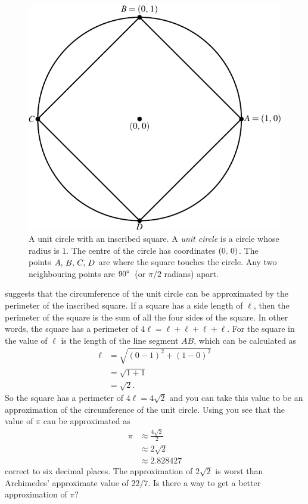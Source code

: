 \documentclass[a4paper,oneside,12pt]{article}
\begin{document}
\begin{figure}[!htbp]
\centering
\includegraphics[scale=1.1]{image/05/circle-square.pdf}
\caption{%
  A unit circle with an inscribed square.  A \emph{unit circle} is a
  circle whose radius is $1$.  The centre of the circle has
  coordinates $\left\lparen{0},\, {0}\right\rparen$.  The points ${A},\, {B},\, {C},\, {D}$ are
  where the square touches the circle.  Any two neighbouring points
  are ${90}^{\circ}$~(or $\pi / 2$ radians) apart.
}
\label{fig:circle_inscribed_square}
\end{figure}

 suggests that the circumference
of the unit circle can be approximated by the perimeter of the
inscribed square.  If a square has a side length of $\ell$, then the
perimeter of the square is the sum of all the four sides of the
square.  In other words, the square has a perimeter of
$4\ell = \ell + \ell + \ell + \ell$.  For the square in
 the value of $\ell$ is the length
of the line segment $AB$, which can be calculated as
\begin{align*}
\ell
&=
\sqrt{(0 - 1)^2 + (1 - 0)^2} \\[4pt]
&=
\sqrt{1 + 1} \\[4pt]
&=
\sqrt{2}.
\end{align*}
So the square has a perimeter of $4\ell = 4\sqrt{2}$ and you can take
this value to be an approximation of the circumference of the unit
circle.  Using  you see
that the value of $\pi$ can be approximated as
\begin{equation}
\label{eqn:approximate_pi_inscribed_square}
\begin{aligned}
\pi
&\approx
\frac{4\sqrt{2}}{2} \\[4pt]
&\approx
2\sqrt{2} \\[4pt]
&\approx
2.828427
\end{aligned}
\end{equation}
correct to six decimal places.  The approximation of $2\sqrt{2}$ is
worst than Archimedes' approximate value of $22/7$.  Is there a way to
get a better approximation of $\pi$?
\end{document}
